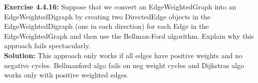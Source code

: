\documentclass[11pt,fleqn]{article}
\begin{document}
\textbf{Exercise 4.4.16:} Suppose that we convert an EdgeWeightedGraph into an EdgeWeightedDigraph
by creating two DirectedEdge objects in the EdgeWeightedDigraph (one in each direction)
for each Edge in the EdgeWeightedGraph and then use the Bellman-Ford algorithm. Explain why this approach
fails spectacularly.\\

\textbf{Solution:} This approach only works if all edges have positive weights and no negative cycles. Bellmanford algo fails on neg weight cycles and Dijkstras algo works only with positive weighted edges.


	
\end{document}
